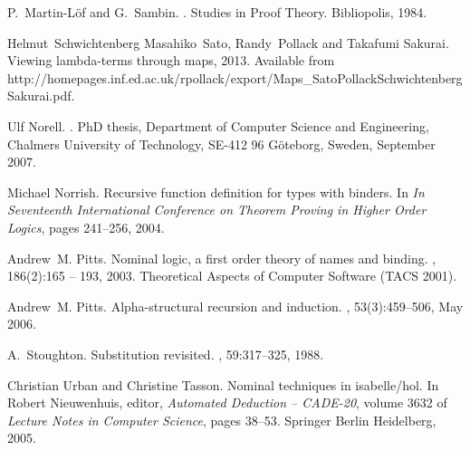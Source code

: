 \documentclass{entcs}
\begin{document}
\begin{thebibliography}{10}
P.~Martin-L{\"o}f and G.~Sambin.
.
\newblock Studies in Proof Theory. Bibliopolis, 1984.

Helmut~Schwichtenberg Masahiko~Sato, Randy~Pollack and Takafumi Sakurai.
\newblock Viewing lambda-terms through maps, 2013.
\newblock Available from
  http://homepages.inf.ed.ac.uk/rpollack/export/Maps\_SatoPollackSchwichtenbergSakurai.pdf.

Ulf Norell.
.
\newblock PhD thesis, Department of Computer Science and Engineering, Chalmers
  University of Technology, SE-412 96 G\"{o}teborg, Sweden, September 2007.

Michael Norrish.
\newblock Recursive function definition for types with binders.
\newblock In {\em In Seventeenth International Conference on Theorem Proving in
  Higher Order Logics}, pages 241--256, 2004.

Andrew~M. Pitts.
\newblock Nominal logic, a first order theory of names and binding.
, 186(2):165 -- 193, 2003.
\newblock Theoretical Aspects of Computer Software (TACS 2001).

Andrew~M. Pitts.
\newblock Alpha-structural recursion and induction.
, 53(3):459--506, May 2006.

A.~Stoughton.
\newblock Substitution revisited.
, 59:317--325, 1988.

Christian Urban and Christine Tasson.
\newblock Nominal techniques in isabelle/hol.
\newblock In Robert Nieuwenhuis, editor, {\em Automated Deduction – CADE-20},
  volume 3632 of {\em Lecture Notes in Computer Science}, pages 38--53.
  Springer Berlin Heidelberg, 2005.

\end{thebibliography}
\end{document}
